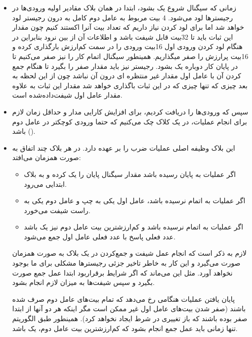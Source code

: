 \documentclass{article}
\begin{document}
\begin{itemize}
\item[\lr{INIT}] زمانی که سیگنال شروع یک بشود، ابتدا در همان بلاک مقادیر اولیه ورودی‌ها در رجیسترها لود می‌شود.  4 بیت مربوط به عامل دوم کامل به درون رجیستر  لود خواهد شد اما برای لود کردن  نیاز داریم که تعداد بیت آنرا اکستند کنیم چون مقدار این ثبات باید تا 32بیت قابل شیفت باشد و اطلاعات آن از بین نرود بنابراین در هنگام لود کردن ورودی اول 16بیت ورودی را در سمت کم‌ارزش بارگذاری کرده و 16بیت پرارزش را صفر میگذاریم. همینطور سیگنال اتمام کار را نیز صفر می‌کنیم تا در پایان کار دوباره یک بشود. رجیستر   نیز باید مقدار صفر را بگیرد تا هنگام جمع کردن آن با عامل اول مقدار غیر منتظره ای درون آن نباشد چون از این لحظه به بعد چیزی که تنها چیزی که در این ثبات باگذاری خواهد شد مقدار این ثبات به علاوه مقدار عامل اول شیفت‌داده‌شده است.

\item[\lr{PRF}] سپس که ورودی‌ها را دریافت کردیم، برای افزایش کارایی مدار و حداقل زمان لازم برای انجام عملیات، در یک کلاک چک می‌کنیم که حتما ورودی کوچکتر در عامل دوم () باشد.

\item[\lr{SHADD}] این بلاک وظیفه اصلی عملیات ضرب را بر عهده دارد. در هر بلاک چند اتفاق به صورت همزمان می‌افتد:
\begin{itemize}
\item اگر عملیات به پایان رسیده باشد مقدار سیگنال پایان را یک کرده و به بلاک ابتدایی می‌رود.
\item اگر عملیات به اتمام نرسیده باشد، عامل اول یکی به چپ و عامل دوم یکی به راست شیفت می‌خورد.
\item اگر عملیات به اتمام نرسیده باشد و کم‌ارزشترین بیت عامل دوم نیز یک باشد عدد فعلی پاسخ با عدد فعلی عامل اول جمع می‌شود.
\end{itemize}

لازم به ذکر است که انجام عمل شیفت و جمع‌کردن در یک بلاک به صورت همزمان صورت می‌گیرد و این کار به خاطر تاخیر جزئی رجیستر‌ها مشکلی برای ما بوجود نخواهد آورد. مثل این می‌ماند که اگر شرایط برقراربود ابتدا عمل جمع صورت بگیرد و سپس شیفت‌ها به میزان لازم انجام بشود.

پایان یافتن عملیات هنگامی رخ می‌دهد که تمام بیت‌های عامل دوم صرف شده باشند (صفر شدن بیت‌های عامل اول غیر ممکن است مگر اینکه هر دو آنها از ابتدا صفر بوده باشند که باز تغییری در شرط ایجاد نخواهد کرد). همینطور طبق الگوریتم تنها زمانی باید عمل جمع انجام بشود که کم‌ارزشترین بیت عامل دوم، یک باشد.
\end{itemize}
\end{document}
